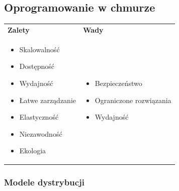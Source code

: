 \documentclass[a4paper]{article}
\begin{document}
    \subsection{Oprogramowanie w chmurze}

    \begin{table}[H]
        \begin{center}
            \begin{tabular}{ p{.5\linewidth} p{.5\linewidth}}
                \textbf{Zalety} & \textbf{Wady}\\

                \begin{itemize}
                    \item Skalowalność
                    \item Dostępność
                    \item Wydajność
                    \item Łatwe zarządzanie
                    \item Elastyczność
                    \item Niezawodność
                    \item Ekologia
                \end{itemize}
                &
                \begin{itemize}
                    \item Bezpieczeństwo
                    \item Ograniczone rozwiązania
                    \item Wydajność
                \end{itemize}
            \end{tabular}
        \end{center}
    \end{table}



    \subsubsection{Modele dystrybucji}
\end{document}
